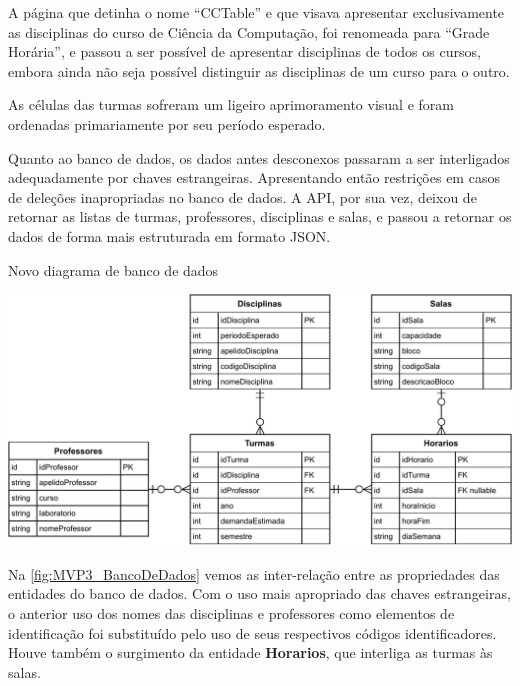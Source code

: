  \label{ssssec:Grade Horária}

A página que detinha o nome ``CCTable'' e que visava apresentar exclusivamente as disciplinas do curso de Ciência da Computação, foi renomeada para ``Grade Horária'', e passou a ser possível de apresentar disciplinas de todos os cursos, embora ainda não seja possível distinguir as disciplinas de um curso para o outro.

As células das turmas sofreram um ligeiro aprimoramento visual e foram ordenadas primariamente por seu período esperado.

 \label{ssssec:Banco de dados}

Quanto ao banco de dados, os dados antes desconexos passaram a ser interligados adequadamente por chaves estrangeiras. Apresentando então restrições em casos de deleções inapropriadas no banco de dados. A API, por sua vez, deixou de retornar as listas de turmas, professores, disciplinas e salas, e passou a retornar os dados de forma mais estruturada em formato JSON.

\begin{MyCenteredFigure} \caption{Novo diagrama de banco de dados} \label{fig:MVP3_BancoDeDados}
  \includegraphics[width=\textwidth]{files/img/2.02!5-desenvolvimento/2.02!5.1.4-sistema/diagramas/Diagrama_ER-How_it_should_be}
\end{MyCenteredFigure}

Na \autoref{fig:MVP3_BancoDeDados} vemos as inter-relação entre as propriedades das entidades do banco de dados. Com o uso mais apropriado das chaves estrangeiras, o anterior uso dos nomes das disciplinas e professores como elementos de identificação foi substituído pelo uso de seus respectivos códigos identificadores. Houve também o surgimento da entidade \textbf{Horarios}, que interliga as turmas às salas.

